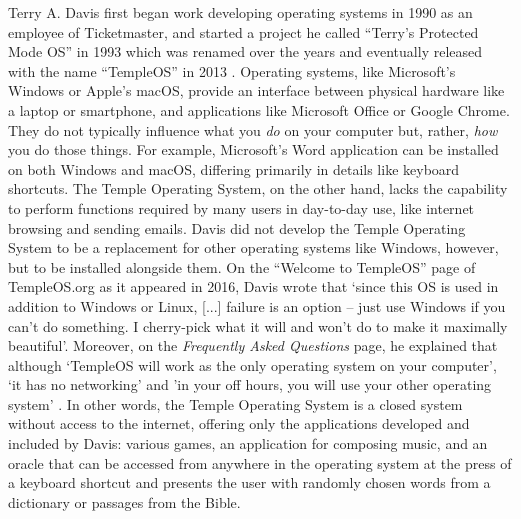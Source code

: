 \documentclass[Draft.tex]{subfiles}
\begin{document}
Terry A. Davis first began work developing operating systems in 1990
as an employee of Ticketmaster, and started a project he called
``Terry's Protected Mode OS'' in 1993 which was renamed over the years
and eventually released with the name ``TempleOS'' in 2013
\parencite{History}.
Operating systems, like Microsoft's Windows or Apple's macOS,
provide an interface between physical hardware like a laptop or smartphone,
and applications like Microsoft Office or Google Chrome.
They do not typically influence what you \textit{do}
on your computer but, rather, \textit{how} you do those things.
For example, Microsoft's Word application can be installed on both
Windows and macOS, differing primarily in details like keyboard shortcuts.
The Temple Operating System, on the other hand,
lacks the capability to perform functions required by many users
in day-to-day use, like internet browsing and sending emails.
Davis did not develop the Temple Operating System to be a
replacement for other operating systems like Windows, however,
but to be installed alongside them.
On the ``Welcome to TempleOS'' page of TempleOS.org
as it appeared in 2016\footnotemark, Davis \parencite*{Welcome} wrote that
`since this OS is used in addition to Windows or Linux,
[...] failure is an option -- just use Windows if you can't do something.
I cherry-pick what it will and won't do to make it maximally beautiful'.
Moreover, on the \textit{Frequently Asked Questions} page, he explained that
although `TempleOS will work as the only operating system on your computer',
`it has no networking' and 'in your off hours,
you will use your other operating system' \parencite{FAQ}.
In other words, the Temple Operating System is a closed system
without access to the internet, offering only the applications
developed and included by Davis: various games,
an application for composing music, and an oracle that can be accessed
from anywhere in the operating system at the press of a keyboard shortcut
and presents the user with randomly
chosen words from a dictionary or passages from the Bible.

\end{document}
